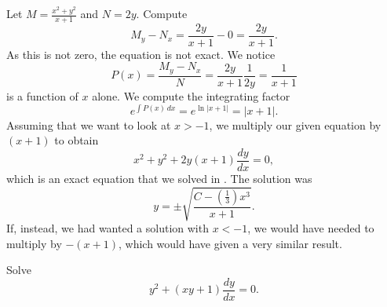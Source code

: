 \documentclass{ximera}
\begin{document}
\begin{exampleSol}
    Let $M= \frac{x^2+y^2}{x+1}$ and $N=2y$. Compute
    \begin{equation*}
        M_y-N_x = \frac{2y}{x+1} - 0 = \frac{2y}{x+1} .
    \end{equation*}
    As this is not zero, the equation is not exact.  We notice 
    \begin{equation*}
        P(x) = \frac{M_y-N_x}{N} = \frac{2y}{x+1} \frac{1}{2y} = \frac{1}{x+1} 
    \end{equation*}
    is a function of $x$ alone.    We compute the integrating factor
    \begin{equation*}
        e^{\int  P(x) \, dx} = e^{\ln |x+1|} = |x+1| .
    \end{equation*}
    Assuming that we want to look at $x > -1$, we multiply our given equation by $(x+1)$ to obtain
    \begin{equation*}
        x^2+y^2 + 2y(x+1) \frac{dy}{dx} = 0 ,
    \end{equation*}
    which is an exact equation that we solved in
    .  The solution was
    \begin{equation*}
        y = \pm \sqrt{\frac{C-(\frac{1}{3})x^3}{x+1}} .
    \end{equation*}
    If, instead, we had wanted a solution with $x < -1$, we would have needed to multiply by $-(x+1)$, which would have given a very similar result. 
\end{exampleSol}

\begin{example}
    Solve
    \begin{equation*}
        y^2 + (xy+1) \frac{dy}{dx} = 0 .
    \end{equation*}
\end{example}
\end{document}
